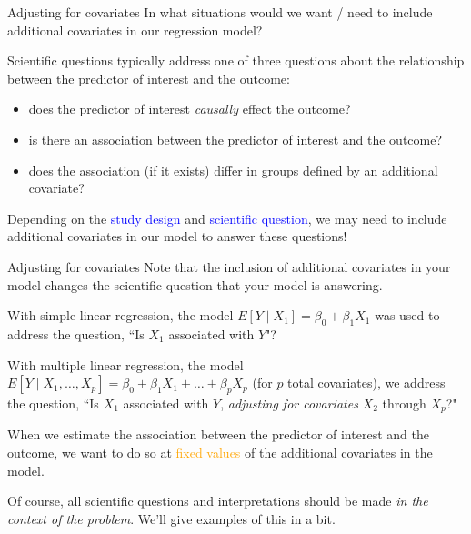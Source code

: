 \documentclass[10pt,t]{beamer}
\begin{document}
\begin{frame}{Adjusting for covariates}
In what situations would we want / need to include additional covariates in our regression model?

\vspace{0.3cm}

Scientific questions typically address one of three questions about the relationship between the predictor of interest and the outcome:

\vspace{0.3cm}

\begin{itemize}
	\item does the predictor of interest \textit{causally} effect the outcome?
	\item is there an association between the predictor of interest and the outcome?
	\item does the association (if it exists) differ in groups defined by an additional covariate?
\end{itemize} \pause

\vspace{0.3cm}

Depending on the \textcolor{blue}{study design} and \textcolor{blue}{scientific question}, we may need to include additional covariates in our model to answer these questions!

\end{frame}

\begin{frame}{Adjusting for covariates}
Note that the inclusion of additional covariates in your model changes the scientific question that your model is answering.

\vspace{0.3cm}

With simple linear regression, the model $E[Y \mid X_1] = \beta_0 + \beta_1 X_1$ was used to address the question, ``Is $X_1$ associated with $Y$"?  \pause

\vspace{0.3cm}

With multiple linear regression, the model $E[Y \mid X_1, \dots, X_p] = \beta_0 + \beta_1 X_1 + \dots + \beta_p X_p$ (for $p$ total covariates), we address the question, ``Is $X_1$ associated with $Y$, \textit{adjusting for covariates} $X_2$ through $X_p$?" \pause

\vspace{0.3cm}

When we estimate the association between the predictor of interest and the outcome, we want to do so at \textcolor{orange}{fixed values} of the additional covariates in the model. \pause

\vspace{0.3cm}

Of course, all scientific questions and interpretations should be made \textit{in the context of the problem}. We'll give examples of this in a bit.
\end{frame}
\end{document}
